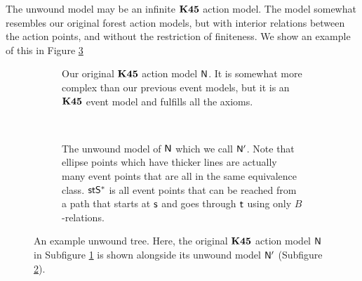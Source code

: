 The unwound model may be an infinite $\bf K45$ action model.
The model somewhat resembles our original forest action models,
but with interior relations between the action points, and without the
restriction of finiteness.
We show an example of this in Figure \ref{generatedTreeExample}

\begin{figure}
\centering
\begin{subfigure}[b]{.45\textwidth}
\centering
{}
\caption{Our original $\bf K45$ action model $\mathrm{\mathsf{N}}$.
It is somewhat more complex than our previous event models, but it is an $\bf K45$ event model and
fulfills all the axioms.}
\label{originalActionModel}
\end{subfigure}
~
\begin{subfigure}[b]{.45\textwidth}
\centering
{}
\caption{The unwound model of $\mathrm{\mathsf{N}}$ which we call $\mathrm{\mathsf{N}}'$. Note that ellipse points which
have thicker lines are actually many event points that are all in the same equivalence class.
$\mathrm{\mathsf{s}} \mathrm{\mathsf{t}} \mathrm{\mathsf{S}}^\ast$ is all event points that can be reached from a path that starts at $\mathrm{\mathsf{s}}$ and
goes through $\mathrm{\mathsf{t}}$ using only $B$-relations.}
\label{unwoundActionModel}
\end{subfigure}
\caption[Example of unwound tree]{An example unwound tree. Here, the original $\bf K45$ action model
$\mathrm{\mathsf{N}}$ in Subfigure \ref{originalActionModel} is shown alongside its unwound model $\mathrm{\mathsf{N}}'$
(Subfigure \ref{unwoundActionModel}). } \label{generatedTreeExample}
\end{figure}

